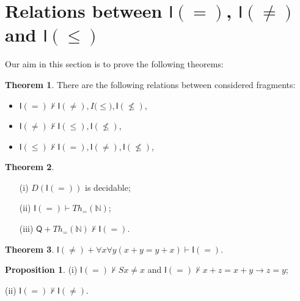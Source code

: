 \documentclass[a4paper,14pt]{article}
\theoremstyle{definition}
\theoremstyle{theorem}
\newtheorem{theorem}{Theorem}[section]
\theoremstyle{lemma}
\theoremstyle{proposition}
\newtheorem{proposition}{Proposition}[section]
\theoremstyle{remark}
\theoremstyle{corollary}
\theoremstyle{problem}
\theoremstyle{hypothesis}
\begin{document}
\section{Relations between $\mathsf{I(=)}$, $\mathsf{I(\ne)}$ and $\mathsf{I(\leqslant)}$}

Our aim in this section is to prove the following theorems:

\begin{theorem}
    There are the following relations between considered fragments:
    \begin{itemize}
        \item $\mathsf I(=) \nvdash \mathsf I(\ne), I\mathsf (\leqslant), \mathsf I(\nleqslant)$,
        \item $\mathsf I(\ne) \nvdash \mathsf I(\leqslant), \mathsf I(\nleqslant)$,
        \item $\mathsf I(\leqslant) \nvdash \mathsf I(=), \mathsf I(\ne), \mathsf I(\nleqslant)$,
    \end{itemize}
\end{theorem}

\begin{theorem}
    \begin{enumerate}
        \item[(i)] $D(\mathsf{I}(=))$ is decidable;
        \item[(ii)] $\mathsf I(=) \vdash Th_=(\mathbb N)$;
        \item[(iii)] $\mathsf Q + Th_=(\mathbb N) \nvdash \mathsf I(=)$.
    \end{enumerate}
\end{theorem}

\begin{theorem}
    $\mathsf{I}(\ne) + \forall x \forall y (x + y = y + x) \vdash \mathsf{I}(=)$.
\end{theorem}

\begin{proposition}
    (i) $\mathsf{I(=)} \nvdash Sx \ne x$ and $\mathsf{I(=)} \nvdash x + z = x + y \rightarrow z = y$;
    
    (ii) $\mathsf{I(=)} \nvdash \mathsf{I(\ne)}$.
\end{proposition}
\end{document}
